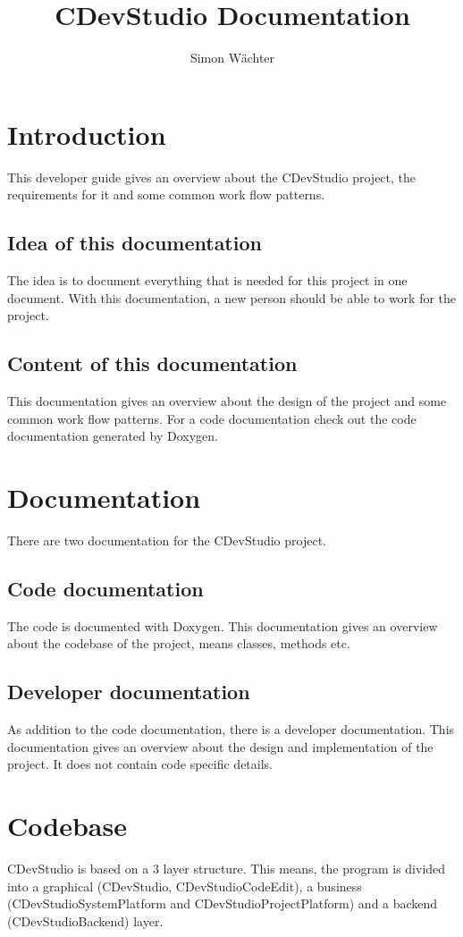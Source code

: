 \documentclass{article}
\title{CDevStudio Documentation}
\author{Simon Wächter}
\begin{document}
\maketitle
\newpage

\tableofcontents
\newpage

\section{Introduction}
This developer guide gives an overview about the CDevStudio project, the requirements for it and some common work flow patterns.

\subsection{Idea of this documentation}
The idea is to document everything that is needed for this project in one document. With this documentation, a new person should be able to work for the project.

\subsection{Content of this documentation}
This documentation gives an overview about the design of the project and some common work flow patterns. For a code documentation check out the code documentation generated by Doxygen.

\section{Documentation}
There are two documentation for the CDevStudio project.

\subsection{Code documentation}
The code is documented with Doxygen. This documentation gives an overview about the codebase of the project, means classes, methods etc.

\subsection{Developer documentation}
As addition to the code documentation, there is a developer documentation. This documentation gives an overview about the design and implementation of the project. It does not contain code specific details.

\section{Codebase}
CDevStudio is based on a 3 layer structure. This means, the program is divided into a graphical (CDevStudio, CDevStudioCodeEdit), a business (CDevStudioSystemPlatform and CDevStudioProjectPlatform) and a backend (CDevStudioBackend) layer.
\end{document}
